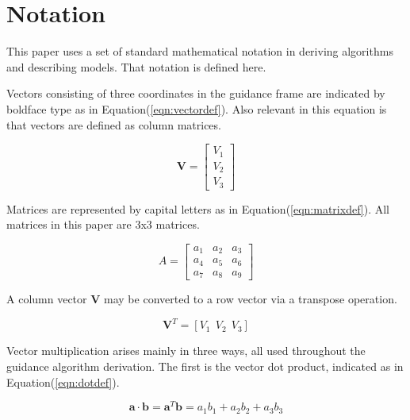 \section{Notation}
This paper uses a set of standard mathematical notation in deriving algorithms and describing models. That notation is defined here.

Vectors consisting of three coordinates in the guidance frame are indicated by boldface type as in Equation\:(\ref{eqn:vectordef}). Also relevant in this equation is that vectors are defined as column matrices.

\begin{equation}
\label{eqn:vectordef}
\bm{V} = 
\begin{bmatrix}
V_1 \\
V_2 \\
V_3
\end{bmatrix}
\end{equation}

Matrices are represented by capital letters as in Equation\:(\ref{eqn:matrixdef}). All matrices in this paper are 3x3 matrices.

\begin{equation}
\label{eqn:matrixdef}
A = 
\begin{bmatrix}
	a_1 & a_2 & a_3 \\
	a_4 & a_5 & a_6 \\
	a_7 & a_8 & a_9
\end{bmatrix}
\end{equation}

A column vector $\bm{V}$ may be converted to a row vector via a transpose operation.

\begin{equation*}
\bm{V}^T = [V_1\:\:V_2\:\:V_3]
\end{equation*}

Vector multiplication arises mainly in three ways, all used throughout the guidance algorithm derivation. The first is the vector dot product, indicated as in Equation\:(\ref{eqn:dotdef}).

\begin{equation}
\label{eqn:dotdef}
\bm{a}\cdot\bm{b} = \bm{a}^T\bm{b} = a_1b_1 + a_2b_2 + a_3b_3
\end{equation}

